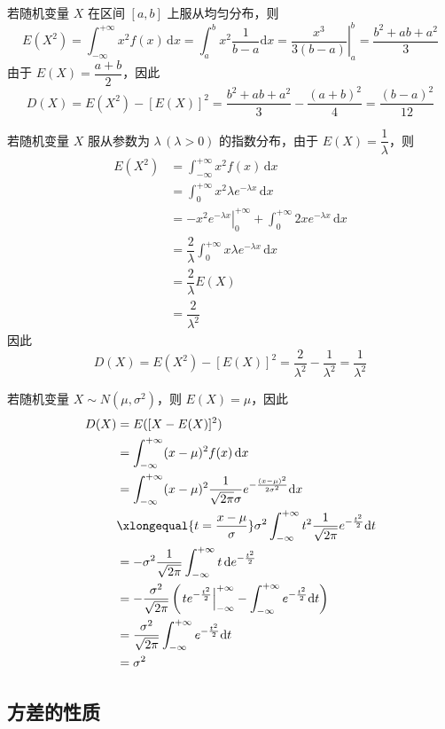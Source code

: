 若随机变量 $X$ 在区间 $[a,b]$ 上服从均匀分布，则
$$
E(X^2) = \int_{-\infty}^{+\infty} x^2 f(x) \, \text{d}x = \int_a^b x^2 \dfrac{1}{b-a} \text{d}x = \left. \dfrac{x^3}{3(b-a)} \right|_a^b = \dfrac{b^2 + ab + a^2}{3}
$$
由于 $E(X) = \dfrac{a+b}{2}$，因此
$$
D(X) = E(X^2) - [E(X)]^2 = \dfrac{b^2 + ab + a^2}{3} - \dfrac{(a+b)^2}{4} = \dfrac{(b-a)^2}{12}
$$

若随机变量 $X$ 服从参数为 $\lambda \, (\lambda > 0)$ 的指数分布，由于 $E(X) = \dfrac{1}{\lambda}$，则
$$
\begin{aligned}
    E(X^2) &= \int_{-\infty}^{+\infty} x^2 f(x) \, \text{d}x \\
    &= \int_0^{+\infty} x^2 \lambda e^{-\lambda x} \, \text{d}x \\
    &= \left. -x^2 e^{-\lambda x} \right|_0^{+\infty} + \int_0^{+\infty} 2x e^{-\lambda x} \, \text{d}x \\
    &= \dfrac{2}{\lambda} \int_0^{+\infty} x \lambda e^{-\lambda x} \, \text{d}x \\
    &= \dfrac{2}{\lambda} E(X) \\
    &= \dfrac{2}{\lambda^2}
\end{aligned}
$$
因此
$$
D(X) = E(X^2) - [E(X)]^2 = \dfrac{2}{\lambda^2} - \dfrac{1}{\lambda^2} = \dfrac{1}{\lambda^2}
$$

若随机变量 $X \sim N(\mu,\sigma^2)$，则 $E(X)=\mu$，因此
$$
\begin{aligned}
    D(X) &= E([X-E(X)]^2) \\
    &= \int_{-\infty}^{+\infty} (x-\mu)^2 f(x) \, \text{d}x \\
    &= \int_{-\infty}^{+\infty} (x-\mu)^2 \dfrac{1}{\sqrt{2 \pi} \sigma} e^{-\frac{(x-\mu)^2}{2 \sigma^2}} \text{d}x \\
    & \xlongequal{t = \frac{x-\mu}{\sigma}} \sigma^2 \int_{-\infty}^{+\infty} t^2 \dfrac{1}{\sqrt{2 \pi}} e^{-\frac{t^2}{2}} \text{d}t \\
    &= -\sigma^2 \dfrac{1}{\sqrt{2 \pi}} \int_{-\infty}^{+\infty} t \, \text{d} e^{-\frac{t^2}{2}} \\
    &= -\dfrac{\sigma^2}{\sqrt{2 \pi}} \left( \left. t e^{-\frac{t^2}{2}} \right|_{-\infty}^{+\infty} - \int_{-\infty}^{+\infty} e^{-\frac{t^2}{2}} \text{d}t \right) \\
    &= \dfrac{\sigma^2}{\sqrt{2 \pi}} \int_{-\infty}^{+\infty} e^{-\frac{t^2}{2}} \text{d}t \\
    &= \sigma^2
\end{aligned}
$$

\subsection{方差的性质}

